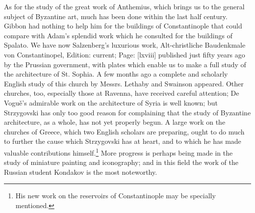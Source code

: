 As for the study of the great work of Anthemius, which brings us to the general subject of Byzantine art, much has been done within the last half century. Gibbon had nothing to help him for the buildings of Constantinople that could compare with Adam\texthebrew{}’s splendid work which he consulted for the buildings of Spalato. We have now Salzenberg\texthebrew{}’s luxurious work, Alt-christliche Baudenkmale von Constantinopel, Edition: current; Page: [lxviii] published just fifty years ago by the Prussian government, with plates which enable us to make a full study of the architecture of St. Sophia. A few months ago a complete and scholarly English study of this church by Messrs. Lethaby and Swainson appeared. Other churches, too, especially those at Ravenna, have received careful attention; De Voguě\texthebrew{}’s admirable work on the architecture of Syria is well known; but Strzygovski has only too good reason for complaining that the study of Byzantine architecture, as a whole, has not yet properly begun. A large work on the churches of Greece, which two English scholars are preparing, ought to do much to further the cause which Strzygovski has at heart, and to which he has made valuable contributions himself.\footnote{His new work on the reservoirs of Constantinople may be specially mentioned.} More progress is perhaps being made in the study of miniature painting and iconography; and in this field the work of the Russian student Kondakov is the most noteworthy.

